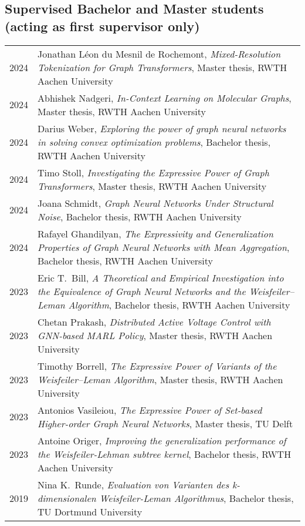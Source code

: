 \documentclass[11pt, a4paper, DIV=14, headings=small]{scrartcl}
\begin{document}
	\subsection*{Supervised Bachelor and Master students (acting as first supervisor only)}
	\begin{longtabu}{p{2.1cm}p{12.0cm}}
		2024 & Jonathan Léon du Mesnil de Rochemont, \emph{Mixed-Resolution Tokenization for Graph Transformers}, Master thesis, RWTH Aachen University \\	
		2024 & Abhishek Nadgeri, \emph{In-Context Learning on Molecular Graphs}, Master thesis, RWTH Aachen University \\	
		2024 & Darius Weber, \emph{Exploring the power of graph neural networks in solving convex optimization problems}, Bachelor thesis, RWTH Aachen University \\	
		2024 & Timo Stoll, \emph{Investigating the Expressive Power of Graph Transformers}, Master thesis, RWTH Aachen University \\	
		2024 & Joana Schmidt, \emph{Graph Neural Networks Under Structural Noise}, Bachelor thesis, RWTH Aachen University \\	
		2024 & Rafayel Ghandilyan, \emph{The Expressivity and Generalization Properties of Graph Neural Networks with Mean Aggregation}, Bachelor thesis, RWTH Aachen University \\	
		2023 & Eric T.\ Bill, \emph{A Theoretical and Empirical Investigation into the Equivalence of Graph Neural Networks and the Weisfeiler--Leman Algorithm}, Bachelor thesis, RWTH Aachen University\\    
		2023 & Chetan Prakash, \emph{Distributed Active Voltage Control with GNN-based MARL Policy}, Master thesis, RWTH Aachen University\\  
		2023 & Timothy Borrell, \emph{The Expressive Power of Variants of the Weisfeiler--Leman Algorithm}, Master thesis, RWTH Aachen University                                     \\
		2023 & Antonios Vasileiou, \emph{The Expressive Power of Set-based Higher-order Graph Neural Networks}, Master thesis, TU Delft                                                                             \\
		2023 & Antoine Origer, \emph{Improving the generalization performance of the Weisfeiler-Lehman subtree kernel}, Bachelor thesis, RWTH Aachen University                                                     \\
		2019 & Nina K.\ Runde, \emph{Evaluation von Varianten des k-dimensionalen Weisfeiler-Leman Algorithmus}, Bachelor thesis, TU Dortmund University                                                            \\

\end{longtabu}
\end{document}
